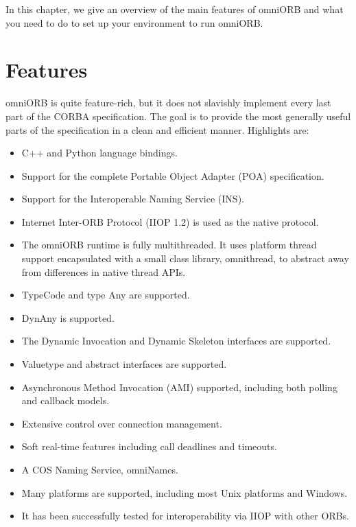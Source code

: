 \documentclass[11pt,twoside,a4paper]{book}
\begin{document}
In this chapter, we give an overview of the main features of omniORB
and what you need to do to set up your environment to run omniORB.

\section{Features}

omniORB is quite feature-rich, but it does not slavishly implement
every last part of the CORBA specification. The goal is to provide the
most generally useful parts of the specification in a clean and
efficient manner. Highlights are:

\begin{itemize}

\item C++ and Python language bindings.

\item Support for the complete Portable Object Adapter (POA) specification.

\item Support for the Interoperable Naming Service (INS).

\item Internet Inter-ORB Protocol (IIOP 1.2) is used as the native
  protocol.

\item The omniORB runtime is fully multithreaded. It uses platform
  thread support encapsulated with a small class library, omnithread,
  to abstract away from differences in native thread APIs.

\item TypeCode and type Any are supported.

\item DynAny is supported.

\item The Dynamic Invocation and Dynamic Skeleton interfaces are supported.

\item Valuetype and abstract interfaces are supported.

\item Asynchronous Method Invocation (AMI) supported, including both
  polling and callback models.

\item Extensive control over connection management.

\item Soft real-time features including call deadlines and timeouts.

\item A COS Naming Service, omniNames.

\item Many platforms are supported, including most Unix platforms and
  Windows.

\item It has been successfully tested for interoperability via IIOP with
  other ORBs.

\end{itemize}
\end{document}
